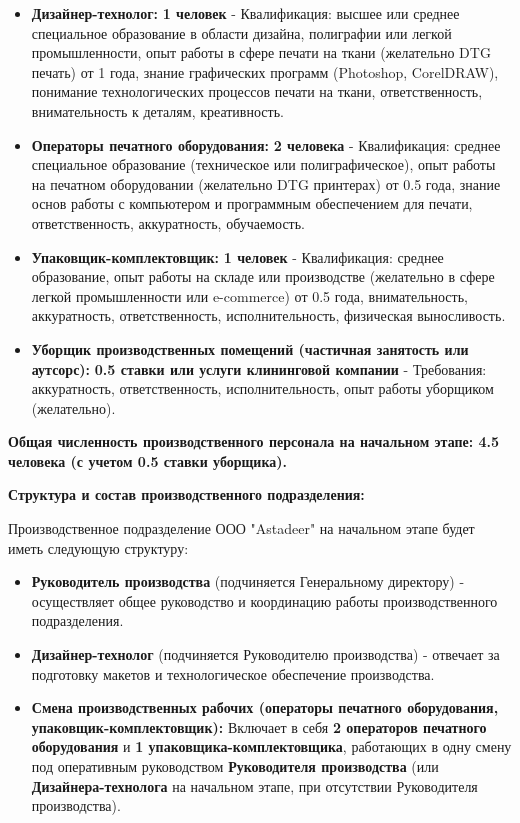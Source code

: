 \begin{itemize}
    \item \textbf{Дизайнер-технолог:} \textbf{1 человек} -  Квалификация: высшее или среднее специальное образование в области дизайна, полиграфии или легкой промышленности, опыт работы в сфере печати на ткани (желательно DTG печать) от 1 года, знание графических программ (Photoshop, CorelDRAW), понимание технологических процессов печати на ткани, ответственность, внимательность к деталям, креативность.
    \item \textbf{Операторы печатного оборудования:} \textbf{2 человека} - Квалификация: среднее специальное образование (техническое или полиграфическое), опыт работы на печатном оборудовании (желательно DTG принтерах) от 0.5 года,  знание основ работы с компьютером и программным обеспечением для печати, ответственность, аккуратность, обучаемость.
    \item \textbf{Упаковщик-комплектовщик:} \textbf{1 человек} - Квалификация: среднее образование, опыт работы на складе или производстве (желательно в сфере легкой промышленности или e-commerce) от 0.5 года,  внимательность, аккуратность, ответственность, исполнительность, физическая выносливость.
    \item \textbf{Уборщик производственных помещений (частичная занятость или аутсорс):} \textbf{0.5 ставки или услуги клининговой компании} -  Требования:  аккуратность, ответственность, исполнительность, опыт работы уборщиком (желательно).
\end{itemize}

\textbf{Общая численность производственного персонала на начальном этапе: 4.5 человека (с учетом 0.5 ставки уборщика).}

\vspace{0.3cm}

\textbf{Структура и состав производственного подразделения:}

Производственное подразделение ООО "Astadeer" на начальном этапе будет иметь следующую структуру:

\begin{itemize}
    \item \textbf{Руководитель производства} (подчиняется Генеральному директору) - осуществляет общее руководство и координацию работы производственного подразделения.
    \item \textbf{Дизайнер-технолог} (подчиняется Руководителю производства) - отвечает за подготовку макетов и технологическое обеспечение производства.
    \item \textbf{Смена производственных рабочих (операторы печатного оборудования, упаковщик-комплектовщик):}  Включает в себя \textbf{2 операторов печатного оборудования} и \textbf{1 упаковщика-комплектовщика}, работающих в одну смену под оперативным руководством \textbf{Руководителя производства} (или \textbf{Дизайнера-технолога} на начальном этапе, при отсутствии Руководителя производства).
\end{itemize}

